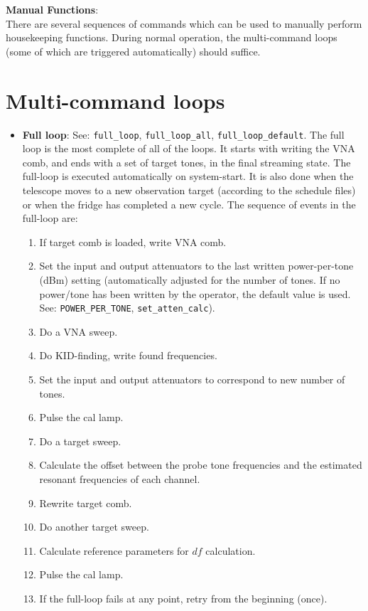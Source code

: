 \noindent \textbf{Manual Functions}:\\
There are several sequences of commands which can be used to manually perform housekeeping functions. During normal operation, the multi-command loops (some of which are triggered automatically) should suffice.

\section{Multi-command loops}\label{multiloops}

\begin{itemize}[leftmargin=*,label={}]

\item \textbf{Full loop}: See: \texttt{full\_loop}, \texttt{full\_loop\_all}, \texttt{full\_loop\_default}. The full loop is the most complete of all of the loops. It starts with writing the VNA comb, and ends with a set of target tones, in the final streaming state. The full-loop is executed automatically on system-start. It is also done when the telescope moves to a new observation target (according to the schedule files) or when the fridge has completed a new cycle. The sequence of events in the full-loop are:
\begin{enumerate}
  \item If target comb is loaded, write VNA comb.
  \item Set the input and output attenuators to the last written power-per-tone (dBm) setting (automatically adjusted for the number of tones. If no power/tone has been written by the operator, the default value is used. See: \texttt{POWER\_PER\_TONE}, \texttt{set\_atten\_calc}).
  \item Do a VNA sweep.
  \item Do KID-finding, write found frequencies.
  \item Set the input and output attenuators to correspond to new number of tones.
  \item Pulse the cal lamp.
  \item Do a target sweep.
  \item Calculate the offset between the probe tone frequencies and the estimated resonant frequencies of each channel.
  \item Rewrite target comb.
  \item Do another target sweep.
  \item Calculate reference parameters for $df$ calculation.
  \item Pulse the cal lamp.
  \item If the full-loop fails at any point, retry from the beginning (once).
\end{enumerate}


\end{itemize}
